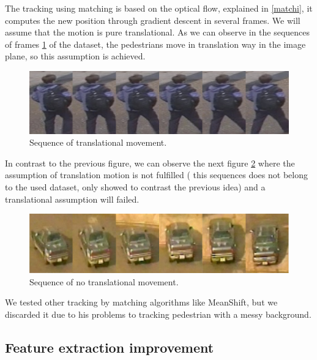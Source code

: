 
The tracking using matching is based on the optical flow, explained in \ref{matchi}, it computes the new position through gradient descent in several frames. We will assume that the motion is pure translational. As we can observe in the sequences of frames \ref{experiTrack1} of the dataset, the pedestrians move in translation way in the image plane, so this assumption is achieved.

\begin{figure}[H]
\centering         
\includegraphics[width=0.9\linewidth]{changeCamera/tomeu.png}
\caption{Sequence of translational movement.} \label{experiTrack1}
\end{figure}

In contrast to the previous figure, we can observe the next figure \ref{experiTrack2} where the assumption of translation motion is not fulfilled ( this sequences does not belong to the used dataset, only showed to contrast the previous idea) and a translational assumption will failed.

\begin{figure}[H]
\centering         
\includegraphics[width=0.9\linewidth]{changeCamera/out2.png}
\caption{Sequence of no translational movement.} \label{experiTrack2}
\end{figure}

We tested other tracking by matching algorithms like MeanShift, but we discarded it due to his problems to tracking pedestrian with a messy background.






\subsection{Feature extraction improvement}\label{exper:validation}

